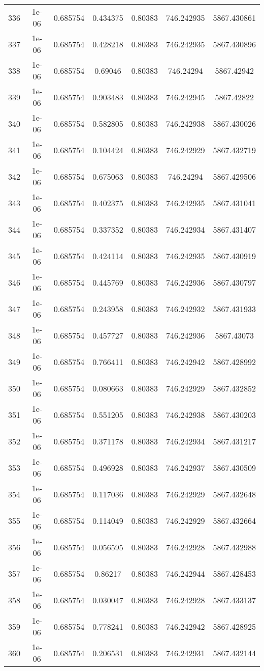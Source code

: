 \begin{table}
\begin{tabular*}{\linewidth}{c|c|c|c|c|c|c}
336 & 1e-06 & 0.685754 & 0.434375 & 0.80383 & 746.242935 & 5867.430861\\
337 & 1e-06 & 0.685754 & 0.428218 & 0.80383 & 746.242935 & 5867.430896\\
338 & 1e-06 & 0.685754 & 0.69046 & 0.80383 & 746.24294 & 5867.42942\\
339 & 1e-06 & 0.685754 & 0.903483 & 0.80383 & 746.242945 & 5867.42822\\
340 & 1e-06 & 0.685754 & 0.582805 & 0.80383 & 746.242938 & 5867.430026\\
341 & 1e-06 & 0.685754 & 0.104424 & 0.80383 & 746.242929 & 5867.432719\\
342 & 1e-06 & 0.685754 & 0.675063 & 0.80383 & 746.24294 & 5867.429506\\
343 & 1e-06 & 0.685754 & 0.402375 & 0.80383 & 746.242935 & 5867.431041\\
344 & 1e-06 & 0.685754 & 0.337352 & 0.80383 & 746.242934 & 5867.431407\\
345 & 1e-06 & 0.685754 & 0.424114 & 0.80383 & 746.242935 & 5867.430919\\
346 & 1e-06 & 0.685754 & 0.445769 & 0.80383 & 746.242936 & 5867.430797\\
347 & 1e-06 & 0.685754 & 0.243958 & 0.80383 & 746.242932 & 5867.431933\\
348 & 1e-06 & 0.685754 & 0.457727 & 0.80383 & 746.242936 & 5867.43073\\
349 & 1e-06 & 0.685754 & 0.766411 & 0.80383 & 746.242942 & 5867.428992\\
350 & 1e-06 & 0.685754 & 0.080663 & 0.80383 & 746.242929 & 5867.432852\\
351 & 1e-06 & 0.685754 & 0.551205 & 0.80383 & 746.242938 & 5867.430203\\
352 & 1e-06 & 0.685754 & 0.371178 & 0.80383 & 746.242934 & 5867.431217\\
353 & 1e-06 & 0.685754 & 0.496928 & 0.80383 & 746.242937 & 5867.430509\\
354 & 1e-06 & 0.685754 & 0.117036 & 0.80383 & 746.242929 & 5867.432648\\
355 & 1e-06 & 0.685754 & 0.114049 & 0.80383 & 746.242929 & 5867.432664\\
356 & 1e-06 & 0.685754 & 0.056595 & 0.80383 & 746.242928 & 5867.432988\\
357 & 1e-06 & 0.685754 & 0.86217 & 0.80383 & 746.242944 & 5867.428453\\
358 & 1e-06 & 0.685754 & 0.030047 & 0.80383 & 746.242928 & 5867.433137\\
359 & 1e-06 & 0.685754 & 0.778241 & 0.80383 & 746.242942 & 5867.428925\\
360 & 1e-06 & 0.685754 & 0.206531 & 0.80383 & 746.242931 & 5867.432144\\
\end{tabular*}
\end{table}
